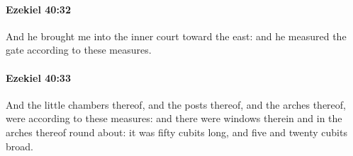 		\paragraph{Ezekiel 40:32} %
			\label{EZEKIEL-40-32}

			And he brought me into the inner court toward the east: and he measured the gate according to these measures.


		\paragraph{Ezekiel 40:33} %
			\label{EZEKIEL-40-33}

			And the little chambers thereof, and the posts thereof, and the arches thereof, were according to these measures: and there were windows therein and in the arches thereof round about: it was fifty cubits long, and five and twenty cubits broad.


